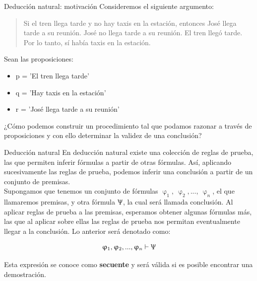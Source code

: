 \documentclass{beamer}
\begin{document}
\begin{frame}{Deducción natural: motivación}
  Consideremos el siguiente argumento:
  \begin{quote}
    Si el tren llega tarde y no hay taxis en la estación, entonces José llega
    tarde a su reunión. José no llega tarde a su reunión. El tren llegó tarde.
    Por lo tanto, sí había taxis en la estación.
  \end{quote}

  Sean las proposiciones:
  \begin{itemize}
    \item p = 'El tren llega tarde'
    \item q = 'Hay taxis en la estación'
    \item r = 'José llega tarde a su reunión'
  \end{itemize}

  ¿Cómo podemos construir un procedimiento tal que podamos razonar a través de
  proposiciones y con ello determinar la validez de una conclusión?
\end{frame}


\begin{frame}{Deducción natural}
  En deducción natural existe una colección de reglas de prueba, las que
  permiten inferir fórmulas a partir de otras fórmulas. Así, aplicando
  sucesivamente las reglas de prueba, podemos inferir una conclusión a partir de
  un conjunto de premisas.\\

  Supongamos que tenemos un conjunto de fórmulas
  $\upvarphi_{1},\ \upvarphi_{2},...,\ \upvarphi_{n}$, el que llamaremos
  premisas, y otra fórmula $\Uppsi$, la cual será llamada conclusión. Al aplicar
  reglas de prueba a las premisas, esperamos obtener algunas fórmulas más, las
  que al aplicar sobre ellas las reglas de prueba nos permitan eventualmente
  llegar a la conclusión. Lo anterior será denotado como:

  $$\upvarphi_{1}, \upvarphi_{2},..., \upvarphi_{n} \vdash \Uppsi$$

  Esta expresión se conoce como \textbf{secuente} y será válida si es posible
  encontrar una demostración.

\end{frame}
\end{document}
